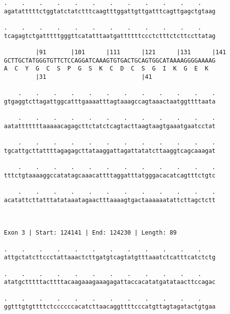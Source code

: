 \documentclass{article}
\begin{document}
\begin{Verbatim}
.    .    .    .    .    .    .    .    .    .    .    .    
agatatttttctggtatctatctttcaagtttggattgttgatttcagttgagctgtaag
                                                            
.    .    .    .    .    .    .    .    .    .    .    .    
tcagagtctgatttttgggttcatatttaatgattttttccctctttctcttccttatag
                                                            
         |91       |101      |111      |121      |131      |141
GCTTGCTATGGGTGTTCTCCAGGATCAAAGTGTGACTGCAGTGGCATAAAAGGGGAAAAG
A  C  Y  G  C  S  P  G  S  K  C  D  C  S  G  I  K  G  E  K  
         |31                           |41                  
  
    .    .    .    .    .    .    .    .    .    .    .    .
gtgaggtcttagattggcatttgaaaatttagtaaagccagtaaactaatggttttaata
                                                            
    .    .    .    .    .    .    .    .    .    .    .    .
aatatttttttaaaaacagagcttctatctcagtacttaagtaagtgaaatgaatcctat
                                                            
    .    .    .    .    .    .    .    .    .    .    .    .
tgcattgcttattttagagagcttataaggattagattatatcttaaggtcagcaaagat
                                                            
    .    .    .    .    .    .    .    .    .    .    .    .
tttctgtaaaaggccatatagcaaacattttaggatttatgggacacatcagtttctgtc
                                                            
    .    .    .    .    .    .    .    .    .    .    .    .
acatattcttatttatataaatagaactttaaaagtgactaaaaaatattcttagctctt
                                                            
                                                            
 
Exon 3 | Start: 124141 | End: 124230 | Length: 89
 
.    .    .    .    .    .    .    .    .    .    .    .    
attgctatcttccctattaaactcttgatgtcagtatgtttaaatctcatttcatctctg
                                                            
.    .    .    .    .    .    .    .    .    .    .    .    
atatgctttttacttttacaagaaagaaagagattaccacatatgatataacttccagac
                                                            
.    .    .    .    .    .    .    .    .    .    .    .    
ggtttgtgttttctccccccacatcttaacaggttttcccatgttagtagatactgtgaa
                                                            

\end{Verbatim}
\end{document}
